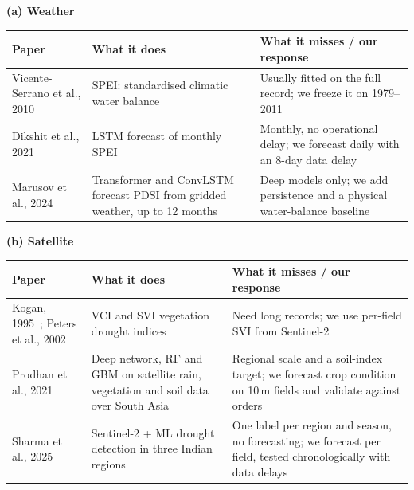 \documentclass[11pt,a4paper,oneside]{article}
\begin{document}
{\scriptsize\renewcommand{\arraystretch}{1.05}%
\par\vspace{6pt}\noindent\begin{minipage}{\textwidth}
\label{tab:lit}\vspace{2pt}
{\small\textbf{(a) Weather}}\\[3pt]
\begin{tabularx}{\textwidth}{|>{\raggedright\arraybackslash}p{3.3cm}|Y|Y|}
\hline
\textbf{Paper} & \textbf{What it does} & \textbf{What it misses / our response} \\ \hline
Vicente-Serrano et al., 2010~\cite{vicente2010} & SPEI: standardised climatic water balance & Usually fitted on the full record; we freeze it on 1979--2011 \\ \hline
Dikshit et al., 2021~\cite{dikshit2021} & LSTM forecast of monthly SPEI & Monthly, no operational delay; we forecast daily with an 8-day data delay \\ \hline
Marusov et al., 2024~\cite{marusov2024} & Transformer and ConvLSTM forecast PDSI from gridded weather, up to 12 months & Deep models only; we add persistence and a physical water-balance baseline \\ \hline
\end{tabularx}
\end{minipage}
\par\vspace{7pt}\noindent\begin{minipage}{\textwidth}
{\small\textbf{(b) Satellite}}\\[3pt]
\begin{tabularx}{\textwidth}{|>{\raggedright\arraybackslash}p{3.3cm}|Y|Y|}
\hline
\textbf{Paper} & \textbf{What it does} & \textbf{What it misses / our response} \\ \hline
Kogan, 1995~\cite{kogan1995}; Peters et al., 2002~\cite{peters2002} & VCI and SVI vegetation drought indices & Need long records; we use per-field SVI from Sentinel-2 \\ \hline
Prodhan et al., 2021~\cite{prodhan2021} & Deep network, RF and GBM on satellite rain, vegetation and soil data over South Asia & Regional scale and a soil-index target; we forecast crop condition on 10\,m fields and validate against orders \\ \hline
Sharma et al., 2025~\cite{sharma2025} & Sentinel-2 + ML drought detection in three Indian regions & One label per region and season, no forecasting; we forecast per field, tested chronologically with data delays \\ \hline

\end{tabularx}
\end{minipage}}
\end{document}
